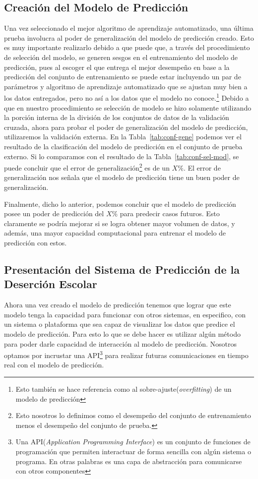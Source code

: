 \subsection{Creación del Modelo de Predicción}
Una vez seleccionado el mejor algoritmo de aprendizaje automatizado, una última prueba involucra al poder de generalización del modelo de predicción creado. Esto es muy importante realizarlo debido a que puede que, a través del procedimiento de selección del modelo, se generen sesgos en el entrenamiento del modelo de predicción, pues al escoger el que entrega el mejor desempeño en base a la predicción del conjunto de entrenamiento se puede estar incluyendo un par de parámetros y algoritmo de aprendizaje automatizado que se ajustan muy bien a los datos entregados, pero no así a los datos que el modelo no conoce.\footnote{Esto también se hace referencia como al sobre-ajuste(\textit{overfitting}) de un modelo de predicción} Debido a que en nuestro procedimiento se selección de modelo se hizo solamente utilizando la porción interna de la división de los conjuntos de datos de la validación cruzada, ahora para probar el poder de generalización del modelo de predicción, utilizaremos la validación externa. En la Tabla~\ref{tab:conf-gene} podemos ver el resultado de la clasificación del modelo de predicción en el conjunto de prueba externo. Si lo comparamos con el resultado de la Tabla~\ref{tab:conf-sel-mod}, se puede concluir que el error de generalización\footnote{Esto nosotros lo definimos como el desempeño del conjunto de entrenamiento menos el desempeño del conjunto de prueba.} es de un $X\%$. El error de generalización nos señala que el modelo de predicción tiene un buen poder de generalización.

Finalmente, dicho lo anterior, podemos concluir que el modelo de predicción posee un poder de predicción del $X\%$ para predecir casos futuros. Esto claramente se podría mejorar si se logra obtener mayor volumen de datos, y además, una mayor capacidad computacional para entrenar el modelo de predicción con estos.
\subsection{Presentación del Sistema de Predicción de la Deserción Escolar}
Ahora una vez creado el modelo de predicción tenemos que lograr que este modelo tenga la capacidad para funcionar con otros sistemas, en especifico, con un sistema o plataforma que sea capaz de visualizar los datos que predice el modelo de predicción. Para esto lo que se debe hacer es utilizar algún método para poder darle capacidad de interacción al modelo de predicción. Nosotros optamos por incrustar una API\footnote{Una API(\textit{Application Programming Interface}) es un conjunto de funciones de programación que permiten interactuar de forma sencilla con algún sistema o programa. En otras palabras es una capa de abstracción para comunicarse con otros componentes} para realizar futuras comunicaciones en tiempo real con el modelo de predicción.

